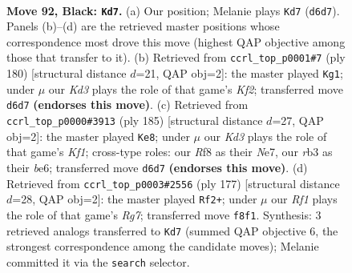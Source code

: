 \documentclass[11pt]{article}
\begin{document}
\clearpage

\begin{figure}[p]\centering
\begin{subfigure}{0.46\textwidth}\centering
\resizebox{\linewidth}{!}{%
\newchessgame
\chessboard[
  setfen={5r2/8/P1nk4/8/8/1R2K1PP/2P1B3/8 b - - 18 92},
  showmover=false,
  pgfstyle=straightmove, color=movearrow, markmove={d6-d7}
]}
\caption{}
\end{subfigure}\hfill
\begin{subfigure}{0.46\textwidth}\centering
\resizebox{\linewidth}{!}{%
\newchessgame
\chessboard[
  setfen={8/5p2/6b1/rk6/8/4N3/5K2/2R5 w - - 4 91},
  showmover=false,
  pgfstyle=straightmove, color=movearrow, markmove={f2-g1}
]}
\caption{}
\end{subfigure}
\\[4pt]
\begin{subfigure}{0.46\textwidth}\centering
\resizebox{\linewidth}{!}{%
\newchessgame
\chessboard[
  setfen={5k2/2p1n3/4B3/4P3/2KP4/8/8/8 b - - 46 93},
  showmover=false,
  pgfstyle=straightmove, color=movearrow, markmove={f8-e8}
]}
\caption{}
\end{subfigure}\hfill
\begin{subfigure}{0.46\textwidth}\centering
\resizebox{\linewidth}{!}{%
\newchessgame
\chessboard[
  setfen={8/8/8/2n2B2/3k1K2/7P/6r1/4R3 b - - 8 89},
  showmover=false,
  pgfstyle=straightmove, color=movearrow, markmove={g2-f2}
]}
\caption{}
\end{subfigure}
\caption{\textbf{Move 92, Black: \texttt{Kd7}.} (a) Our position; Melanie plays \texttt{Kd7} (\texttt{d6d7}). Panels (b)--(d) are the retrieved master positions whose correspondence most drove this move (highest QAP objective among those that transfer to it). (b) Retrieved from \texttt{ccrl\_top\_p0001\#7} (ply 180) [structural distance $d$=21, QAP obj=2]: the master played \texttt{Kg1}; under $\mu$ our \emph{Kd3} plays the role of that game's \emph{Kf2}; transferred move \texttt{d6d7} \textbf{(endorses this move)}. (c) Retrieved from \texttt{ccrl\_top\_p0000\#3913} (ply 185) [structural distance $d$=27, QAP obj=2]: the master played \texttt{Ke8}; under $\mu$ our \emph{Kd3} plays the role of that game's \emph{Kf1}; cross-type roles: our \emph{R}f8 as their \emph{N}e7, our \emph{r}b3 as their \emph{b}e6; transferred move \texttt{d6d7} \textbf{(endorses this move)}. (d) Retrieved from \texttt{ccrl\_top\_p0003\#2556} (ply 177) [structural distance $d$=28, QAP obj=2]: the master played \texttt{Rf2+}; under $\mu$ our \emph{Rf1} plays the role of that game's \emph{Rg7}; transferred move \texttt{f8f1}. Synthesis: 3 retrieved analogs transferred to \texttt{Kd7} (summed QAP objective 6, the strongest correspondence among the candidate moves); Melanie committed it via the \texttt{search} selector.}
\label{fig:thought-m183}
\end{figure}
\end{document}
